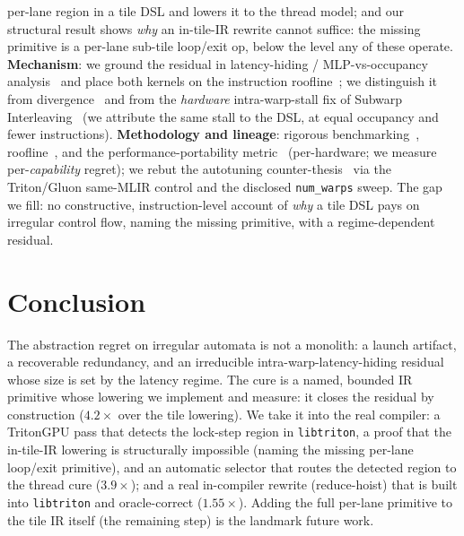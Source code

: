 \documentclass[sigplan,review,anonymous,10pt]{acmart}
\begin{document}
per-lane region in a tile DSL and lowers it to the thread model; and our structural result shows
\emph{why} an in-tile-IR rewrite cannot suffice: the missing primitive is a per-lane sub-tile loop/exit
op, below the level any of these operate.
\textbf{Mechanism}: we ground the residual in latency-hiding / MLP-vs-occupancy
analysis~\cite{volkov2016latency,hongkim2009} and place both kernels on the instruction
roofline~\cite{instroofline2022}; we distinguish it from divergence~\cite{fung2007} and from the
\emph{hardware} intra-warp-stall fix of Subwarp Interleaving~\cite{subwarp2022} (we attribute the
same stall to the DSL, at equal occupancy and fewer instructions).
\textbf{Methodology and lineage}: rigorous benchmarking~\cite{hoefler2015}, roofline~\cite{roofline2009},
and the performance-portability metric~\cite{pennycook2016} (per-hardware; we measure per-\emph{capability}
regret); we rebut the autotuning counter-thesis~\cite{ringlein2025} via the Triton/Gluon same-MLIR
control and the disclosed \texttt{num\_warps} sweep. The gap we fill: no constructive,
instruction-level account of \emph{why} a tile DSL pays on irregular control flow, naming the missing
primitive, with a regime-dependent residual.

\section{Conclusion}
The abstraction regret on irregular automata is not a monolith: a launch artifact, a recoverable
redundancy, and an irreducible intra-warp-latency-hiding residual whose size is set by the latency
regime. The cure is a named, bounded IR primitive whose lowering we implement and measure: it closes
the residual by construction ($4.2\times$ over the tile lowering). We take it into the real compiler: a
TritonGPU pass that detects the lock-step region in \texttt{libtriton}, a proof that the in-tile-IR
lowering is structurally impossible (naming the missing per-lane loop/exit primitive), and an automatic
selector that routes the detected region to the thread cure ($3.9\times$); and a real in-compiler
rewrite (reduce-hoist) that is built into \texttt{libtriton} and oracle-correct ($1.55\times$). Adding the
full per-lane primitive to the tile IR itself (the remaining step) is the landmark future work.
\end{document}
